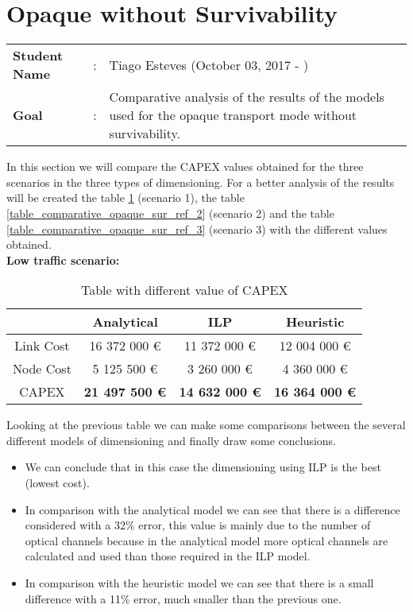 \clearpage

\section{Opaque without Survivability}\label{comparative_Opaque_Survivability}
\begin{tcolorbox}	
\begin{tabular}{p{2.75cm} p{0.2cm} p{10.5cm}} 	
\textbf{Student Name}  &:& Tiago Esteves    (October 03, 2017 - )\\
\textbf{Goal}          &:& Comparative analysis of the results of the models used for the opaque transport mode without survivability.
\end{tabular}
\end{tcolorbox}
\vspace{11pt}


In this section we will compare the CAPEX values obtained for the three scenarios in the three types of dimensioning. For a better analysis of the results will be created the table \ref{table_comparative_opaque_sur_ref_1} (scenario 1), the table \ref{table_comparative_opaque_sur_ref_2} (scenario 2) and the table \ref{table_comparative_opaque_sur_ref_3} (scenario 3) with the different values obtained.\\

\textbf{Low traffic scenario:}

\begin{table}[h!]
\centering
\begin{tabular}{| c | c | c | c |}
 \hline
   & Analytical & ILP & Heuristic \\
 \hline\hline
 Link Cost & 16 372 000 \euro & 11 372 000 \euro & 12 004 000 \euro \\
 Node Cost & 5 125 500 \euro & 3 260 000 \euro & 4 360 000 \euro \\
 CAPEX & \textbf{21 497 500 \euro} & \textbf{14 632 000 \euro} & \textbf{16 364 000 \euro} \\
 \hline
\end{tabular}
\caption{Table with different value of CAPEX }
\label{table_comparative_opaque_sur_ref_1}
\end{table}

\vspace{11pt}
Looking at the previous table we can make some comparisons between the several different models of dimensioning and finally draw some conclusions.

\begin{itemize}
  \item We can conclude that in this case the dimensioning using ILP is the best (lowest cost).
  \item In comparison with the analytical model we can see that there is a difference considered with a 32\% error, this value is mainly due to the number of optical channels because in the analytical model more optical channels are calculated and used than those required in the ILP model.
  \item In comparison with the heuristic model we can see that there is a small difference with a 11\% error, much smaller than the previous one.
\end{itemize}

